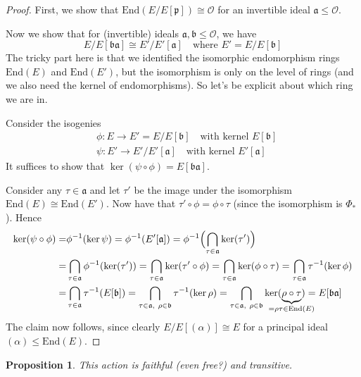 \documentclass{scrartcl}
\newcommand{\End}{\mathrm{End}}
\newcommand{\Order}{\mathcal{O}}
\newtheorem{prop}{Proposition}[section]
\theoremstyle{definition}
\begin{document}
\begin{proof}
    First, we show that $\End(E/E[\mathfrak{p}]) \cong \Order$ for an invertible ideal $\mathfrak{a} \leq \Order$.

    Now we show that for (invertible) ideals $\mathfrak{a}, \mathfrak{b} \leq \Order$, we have
    \begin{equation*}
        E/E[\mathfrak{b}\mathfrak{a}] \cong E'/E'[\mathfrak{a}] \quad \text{where $E' = E/E[\mathfrak{b}]$}
    \end{equation*}
    The tricky part here is that we identified the isomorphic endomorphism rings $\End(E)$ and $\End(E')$, but the isomorphism is only on the level of rings (and we also need the kernel of endomorphisms).
    So let's be explicit about which ring we are in.

    Consider the isogenies
    \begin{align*}
        &\phi: E \to E' = E/E[\mathfrak{b}] \quad \text{with kernel $E[\mathfrak{b}]$} \\
        &\psi: E' \to E'/E'[\mathfrak{a}] \quad \text{with kernel $E'[\mathfrak{a}]$}
    \end{align*}
    It suffices to show that $\ker(\psi \circ \phi) = E[\mathfrak{b}\mathfrak{a}]$.

    Consider any $\tau \in \mathfrak{a}$ and let $\tau'$ be the image under the isomorphism $\End(E) \cong \End(E')$.
    Now have that $\tau' \circ \phi = \phi \circ \tau$ (since the isomorphism is $\Phi_*$).
    Hence
    \begin{align*}
        \ker(\psi \circ \phi) =& \phi^{-1}(\ker\psi) = \phi^{-1}(E'[\mathfrak{a}]) = \phi^{-1}\Bigl( \bigcap_{\tau \in \mathfrak{a}} \ker(\tau') \Bigr) \\
        =& \bigcap_{\tau \in \mathfrak{a}} \phi^{-1}(\ker(\tau')) = \bigcap_{\tau \in \mathfrak{a}} \ker(\tau' \circ \phi) = \bigcap_{\tau \in \mathfrak{a}} \ker(\phi \circ \tau) = \bigcap_{\tau \in \mathfrak{a}} \tau^{-1}(\ker\phi) \\
        =& \bigcap_{\tau \in \mathfrak{a}} \tau^{-1}(E[\mathfrak{b}]) = \bigcap_{\tau \in \mathfrak{a}, \ \rho \in \mathfrak{b}} \tau^{-1}(\ker\rho) = \bigcap_{\tau \in \mathfrak{a}, \ \rho \in \mathfrak{b}} \ker(\underbrace{\rho \circ \tau}_{\mathclap{= \rho\tau \in \End(E)}}) = E[\mathfrak{b}\mathfrak{a}]
    \end{align*}
    The claim now follows, since clearly $E/E[(\alpha)] \cong E$ for a principal ideal $(\alpha) \leq \End(E)$.
\end{proof}
\begin{prop}
    This action is faithful (even free?) and transitive.
\end{prop}
\end{document}
